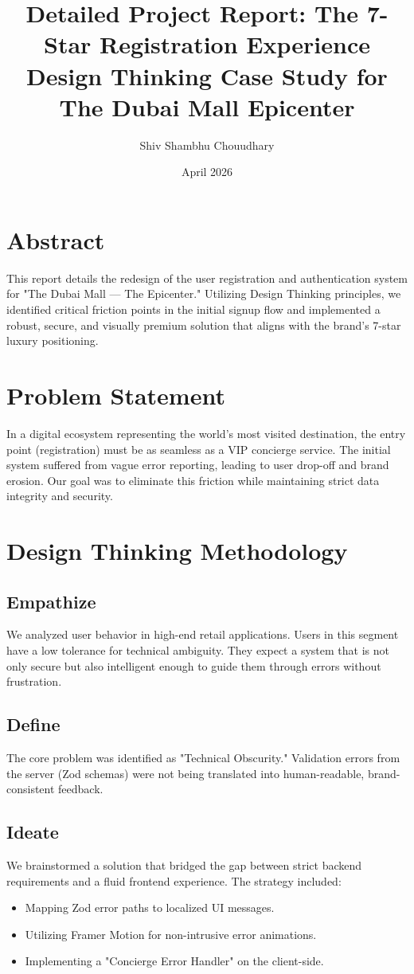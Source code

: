 \documentclass[11pt,a4paper]{article}
\title{Detailed Project Report: The 7-Star Registration Experience \\ \large Design Thinking Case Study for The Dubai Mall Epicenter}
\author{Shiv Shambhu Chouudhary}
\date{April 2026}
\begin{document}
\maketitle

\section{Abstract}
This report details the redesign of the user registration and authentication system for "The Dubai Mall --- The Epicenter." Utilizing Design Thinking principles, we identified critical friction points in the initial signup flow and implemented a robust, secure, and visually premium solution that aligns with the brand's 7-star luxury positioning.

\section{Problem Statement}
In a digital ecosystem representing the world's most visited destination, the entry point (registration) must be as seamless as a VIP concierge service. The initial system suffered from vague error reporting, leading to user drop-off and brand erosion. Our goal was to eliminate this friction while maintaining strict data integrity and security.

\section{Design Thinking Methodology}

\subsection{Empathize}
We analyzed user behavior in high-end retail applications. Users in this segment have a low tolerance for technical ambiguity. They expect a system that is not only secure but also intelligent enough to guide them through errors without frustration.

\subsection{Define}
The core problem was identified as "Technical Obscurity." Validation errors from the server (Zod schemas) were not being translated into human-readable, brand-consistent feedback.

\subsection{Ideate}
We brainstormed a solution that bridged the gap between strict backend requirements and a fluid frontend experience. The strategy included:
\begin{itemize}
    \item Mapping Zod error paths to localized UI messages.
    \item Utilizing Framer Motion for non-intrusive error animations.
    \item Implementing a "Concierge Error Handler" on the client-side.
\end{itemize}
\end{document}
